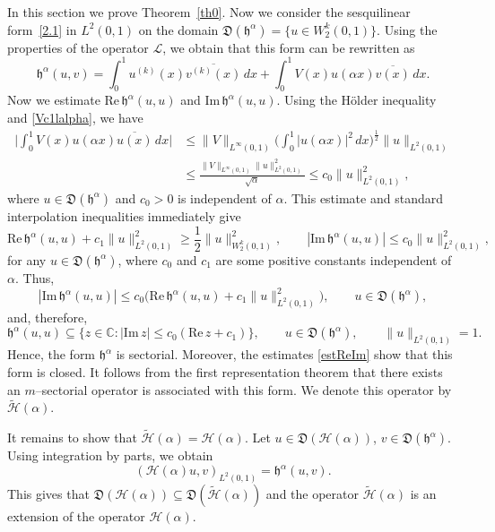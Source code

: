 \documentclass[11pt,centertags,reqno,twoside]{amsart}
\numberwithin{equation}{section}
\theoremstyle{definition}
\theoremstyle{remark}
\begin{document}
In this section we prove Theorem~\ref{th0}. Now we consider the
sesquilinear form~\eqref{2.1} in $L^2(0, 1)$ on the domain
$\mathfrak{D}(\mathfrak{h}^\alpha)=\{u\in W_2^k(0, 1)\}$. Using the properties
of the operator $\mathcal{L}$, we obtain that this form can be rewritten as
\[
\mathfrak{h}^\alpha(u, v)=\int_0^1 u^{(k)}(x)\overline{v^{(k)}(x)}\,dx
+\int_0^1 V(x)u(\alpha x)\overline{v(x)}\,dx.
\]
Now we estimate $\mathrm{Re}\,\mathfrak{h}^\alpha(u, u)$ and
$\mathrm{Im}\,\mathfrak{h}^\alpha(u, u)$. Using the H\"older inequality and
\eqref{Vc1lalpha}, we have
\begin{align*}
\bigg|\int_0^1 V(x)u(\alpha x)\overline{u(x)}\,dx\bigg| &\leqslant
\|V\|_{L^\infty(0, 1)}\bigg(\int_0^1|u(\alpha x)|^2\,dx\bigg)^\frac{1}{2}
\|u\|_{L^2(0, 1)} \\
&\leqslant \frac{\|V\|_{L^\infty(0, 1)}\|u\|_{L^2(0, 1)}^2}{\sqrt{\alpha}}\leqslant
c_0\|u\|_{L^2(0, 1)}^2,
\end{align*}
where $u\in\mathfrak{D}(\mathfrak{h}^\alpha)$ and $c_0>0$ is independent
of $\alpha$. This estimate and standard interpolation inequalities immediately give
\begin{equation}\label{estReIm}
\mathrm{Re}\,\mathfrak{h}^\alpha(u, u)+c_1\|u\|^2_{L^2(0, 1)}\geqslant
\frac{1}{2}\|u\|^2_{W^k_2(0, 1)}, \qquad
|\mathrm{Im}\,\mathfrak{h}^\alpha(u, u)|\leqslant c_0\|u\|_{L^2(0, 1)}^2,
\end{equation}
for any $u\in\mathfrak{D}(\mathfrak{h}^\alpha)$, where $c_0$ and $c_1$
are some positive constants independent of $\alpha$. Thus,
\[
|\mathrm{Im}\,\mathfrak{h}^\alpha(u, u)|\leqslant
c_0\Big(\mathrm{Re}\,\mathfrak{h}^\alpha(u, u)+c_1\|u\|^2_{L^2(0, 1)}\Big),
\qquad u\in\mathfrak{D}(\mathfrak{h}^\alpha),
\]
and, therefore,
\begin{equation}\label{subset}
\mathfrak{h}^\alpha(u, u)\subseteq \{z\in\mathbb{C}:
|\mathrm{Im}\,z|\leqslant c_0(\mathrm{Re}\,z+c_1)\}, \qquad
u\in\mathfrak{D}(\mathfrak{h}^\alpha), \qquad \|u\|_{L^2(0, 1)}=1.
\end{equation}
Hence, the form $\mathfrak{h}^\alpha$ is sectorial. Moreover, the estimates
\eqref{estReIm} show that this form is closed. It follows from the first
representation theorem \cite[Ch. V\!I, Sect. 2.1, Thm.~2.1]{Kato} that there
exists an $m$--sectorial operator is associated with this form. We denote this operator by
$\widetilde{\mathcal{H}}(\alpha)$.

It remains to show that $\widetilde{\mathcal{H}}(\alpha)=\mathcal{H}(\alpha)$.
Let $u\in\mathfrak{D}(\mathcal{H}(\alpha))$, $v\in\mathfrak{D}(\mathfrak{h}^\alpha)$.
Using integration by parts, we obtain
\[
(\mathcal{H}(\alpha)u, v)_{L^2(0, 1)}=\mathfrak{h}^\alpha(u, v).
\]
This gives that $\mathfrak{D}(\mathcal{H}(\alpha))\subseteq
\mathfrak{D}(\widetilde{\mathcal{H}}(\alpha))$ and the operator
$\widetilde{\mathcal{H}}(\alpha)$ is an extension of the operator
$\mathcal{H}(\alpha)$.
\end{document}
